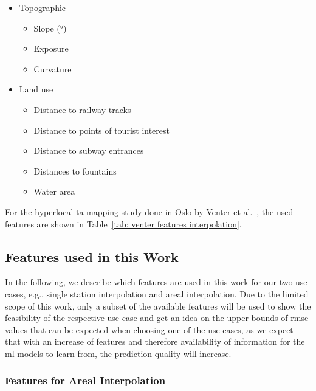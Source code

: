 \begin{itemize}
    \item Topographic

    \begin{itemize}
        \item Slope (°)
        \item Exposure
        \item Curvature
    \end{itemize}
    \item Land use

    \begin{itemize}
        \item Distance to railway tracks
        \item Distance to points of tourist interest
        \item Distance to subway entrances
        \item Distances to fountains
        \item Water area
    \end{itemize}
\end{itemize}

For the hyperlocal \gls{ta} mapping study done in Oslo by Venter et al.~\cite{venter2020hyperlocal}, the used features are shown in Table~\ref{tab: venter features interpolation}.

\subsection{Features used in this Work}

In the following, we describe which features are used in this work for our two use-cases, e.g., single station interpolation and areal interpolation. Due to the limited scope of this work, only a subset of the available features will be used to show the feasibility of the respective use-case and get an idea on the upper bounds of \gls{rmse} values that can be expected when choosing one of the use-cases, as we expect that with an increase of features and therefore availability of information for the \gls{ml} models to learn from, the prediction quality will increase.

\subsubsection{Features for Areal Interpolation}

